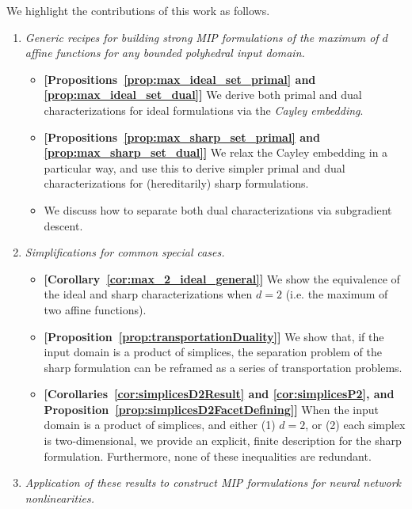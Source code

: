 \documentclass[smallextended]{svjour3}
\newcommand{\blue}[1]{{#1}}
\begin{document}
We highlight the contributions of this work as follows.
\begin{enumerate}
    \item \emph{Generic recipes for building strong MIP formulations of the maximum of $d$ affine functions for any bounded polyhedral input domain.}
    \begin{itemize}
        \item \textbf{[Propositions~\ref{prop:max_ideal_set_primal} and \ref{prop:max_ideal_set_dual}]} We derive both primal and dual characterizations for ideal formulations via the \emph{Cayley embedding}.
        \item \textbf{[Propositions~\ref{prop:max_sharp_set_primal} and \ref{prop:max_sharp_set_dual}]} We relax the Cayley embedding in a particular way, and use this to derive simpler primal and dual characterizations for (hereditarily) sharp formulations.
        \item We discuss how to separate both dual characterizations via subgradient descent.
    \end{itemize}
    \item \emph{Simplifications for common special cases.}
    \begin{itemize}
        \item \textbf{[Corollary~\ref{cor:max_2_ideal_general}]} We show the equivalence of the ideal and sharp characterizations when $d=2$ \blue{(i.e. the maximum of two affine functions)}.
        \item \textbf{[Proposition~\ref{prop:transportationDuality}]} We show that, if the input domain is a product of simplices, the separation problem of the sharp formulation can be reframed as a series of transportation problems.
        \item \textbf{[Corollaries~\ref{cor:simplicesD2Result} and \ref{cor:simplicesP2}, and Proposition~\ref{prop:simplicesD2FacetDefining}]} When the input domain is a product of simplices, and either (1) $d=2$, or (2) each simplex is two-dimensional, we provide an explicit, finite description for the sharp formulation. Furthermore, none of these inequalities are redundant.
    \end{itemize}
    \item \emph{Application of these results to construct MIP formulations for neural network nonlinearities.}

\end{enumerate}
\end{document}
